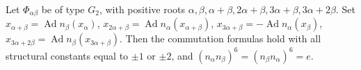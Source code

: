 Let $\Phi_{\alpha\beta}$ be of type $G_2$, with positive roots $\alpha, \beta, \alpha+\beta, 2\alpha+\beta, 3\alpha+\beta, 3\alpha+2\beta$. Set $x_{\alpha+\beta} = \operatorname{Ad} n_{\beta}(x_{\alpha})$, $x_{2\alpha+\beta} = \operatorname{Ad} n_{\alpha}(x_{\alpha+\beta})$, $x_{3\alpha+\beta} = -\operatorname{Ad} n_{\alpha}(x_{\beta})$, $x_{3\alpha+2\beta} = \operatorname{Ad} n_{\beta}(x_{3\alpha+\beta})$. Then the commutation formulas hold with all structural constants equal to $\pm 1$ or $\pm 2$, and $(n_{\alpha}n_{\beta})^{6} = (n_{\beta}n_{\alpha})^{6} = e$.
